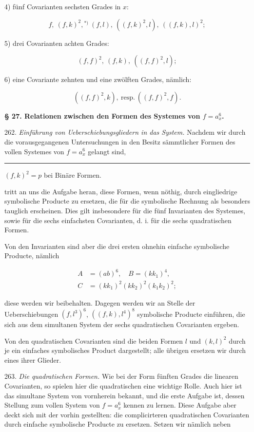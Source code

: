 \documentclass[11pt]{article}
\providecommand{\gesperrt}[1]{\textls[130]{#1}}
\providecommand{\weberpage}[1]{}
\begin{document}
4) fünf Covarianten sechsten Grades in $x$:

\[
f, \ (f, k)^2, {}^{*)} \ (f, l), \ ((f, k)^2, l), \ ((f, k), l)^2;
\]

5) drei Covarianten achten Grades:

\[
(f, f)^2, \ (f, k), \ ((f, f)^2, l);
\]

6) eine Covariante zehnten und eine zwölften Grades, nämlich:

\[
((f, f)^2, k), \ \text{resp.} \ ((f, f)^2, f).
\]

\bigskip
\noindent\textbf{§ 27. Relationen zwischen den Formen des Systemes von $f = a_x^6$.}
\bigskip

262. \textit{Einführung von Ueberschiebungsgliedern in das System.} Nachdem
 wir durch die vorausgegangenen Untersuchungen in den Besitz
sämmtlicher Formen des vollen Systemes von $f = a_x^6$ gelangt sind,

\bigskip
\noindent\rule{4cm}{0.4pt}

\noindent{*)} $(f, k)^2 = p$ bei \gesperrt{Clebsch} \glqq Binäre Formen\grqq.


\weberpage{284}
tritt an uns die Aufgabe heran, diese Formen, wenn nöthig, durch
eingliedrige symbolische Producte zu ersetzen, die für die symbolische
Rechnung als besonders tauglich erscheinen. Dies gilt insbesondere
für die fünf Invarianten des Systemes, sowie für die sechs einfachsten
Covarianten, d. i. für die sechs quadratischen Formen.

Von den Invarianten sind aber die drei ersten ohnehin einfache
symbolische Producte, nämlich

\[
\begin{aligned}
A &= (ab)^6, \quad B = (kk_1)^4,\\
C &= (kk_1)^2 (kk_2)^2 (k_1k_2)^2;
\end{aligned}
\]

diese werden wir beibehalten. Dagegen werden wir an Stelle der
Ueberschiebungen $(f, l^3)^6$, $((f, k), l^4)^8$ symbolische Producte einführen,
die sich aus dem simultanen System der sechs quadratischen Covarianten
 ergeben.

Von den quadratischen Covarianten sind die beiden Formen $l$
und $(k, l)^2$ durch je ein einfaches symbolisches Product dargestellt;
alle übrigen ersetzen wir durch eines ihrer Glieder.

263. \textit{Die quadratischen Formen.} Wie bei der Form fünften
Grades die linearen Covarianten, so spielen hier die quadratischen eine
wichtige Rolle. Auch hier ist das simultane System von vornherein
bekannt, und die erste Aufgabe ist, dessen Stellung zum vollen System
von $f = a_x^6$ kennen zu lernen. Diese Aufgabe aber deckt sich mit der
vorhin gestellten: die complicirteren quadratischen Covarianten durch
einfache symbolische Producte zu ersetzen. Setzen wir nämlich neben
\end{document}

